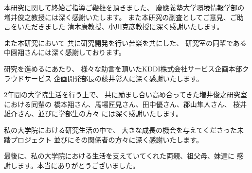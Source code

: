 \begin{acknowledgment}

本研究に関して終始ご指導ご鞭撻を頂きました、
慶應義塾大学環境情報学部の増井俊之教授には深く感謝いたします。
また本研究の副査としてご意見、ご助言をいただきました
清木康教授、小川克彦教授に深く感謝いたします。

また本研究において
共に研究開発を行い苦楽を共にした、
研究室の同輩である中園翔さんには深く感謝しております。

研究を進めるにあたり、
様々な助言を頂いたKDDI株式会社サービス企画本部クラウドサービス
企画開発部長の藤井彰人に深く感謝いたします。

2年間の大学院生活を行う上で、
共に励まし合い高め合ってきた増井俊之研究室における同輩の
橋本翔さん、馬場匠見さん、田中優さん、郡山隼人さん、
桜井雄介さん、並びに学部生の方々
には深く感謝いたします。

私の大学院における研究生活の中で、
大きな成長の機会を与えてくださった未踏プロジェクト
並びにその関係者の方々に深く感謝いたします。

最後に、私の大学院における生活を支えていてくれた両親、祖父母、妹達に
感謝します。本当にありがとうございました。

\end{acknowledgment}
